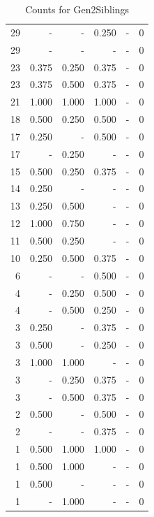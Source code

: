 \documentclass[a4paper]{article}\usepackage{graphicx, color}
\begin{document}
\begin{table}[ht]
\begin{tabular}{rrrrrr}
   \rowcolor{sosoColor} 29 & - & - & 0.250 & - & 0 \\ 
   \rowcolor{nullColor} 29 & - & - & - & - & 0 \\ 
  23 & 0.375 & 0.250 & 0.375 & - & 0 \\ 
  23 & 0.375 & 0.500 & 0.375 & - & 0 \\ 
   \rowcolor{goodColor} 21 & 1.000 & 1.000 & 1.000 & - & 0 \\ 
   \rowcolor{badColor} 18 & 0.500 & 0.250 & 0.500 & - & 0 \\ 
   \rowcolor{sosoColor} 17 & 0.250 & - & 0.500 & - & 0 \\ 
  17 & - & 0.250 & - & - & 0 \\ 
  15 & 0.500 & 0.250 & 0.375 & - & 0 \\ 
   \rowcolor{nullColor} 14 & 0.250 & - & - & - & 0 \\ 
  13 & 0.250 & 0.500 & - & - & 0 \\ 
  12 & 1.000 & 0.750 & - & - & 0 \\ 
  11 & 0.500 & 0.250 & - & - & 0 \\ 
  10 & 0.250 & 0.500 & 0.375 & - & 0 \\ 
   \rowcolor{sosoColor} 6 & - & - & 0.500 & - & 0 \\ 
   \rowcolor{badColor} 4 & - & 0.250 & 0.500 & - & 0 \\ 
   \rowcolor{badColor} 4 & - & 0.500 & 0.250 & - & 0 \\ 
   \rowcolor{sosoColor} 3 & 0.250 & - & 0.375 & - & 0 \\ 
   \rowcolor{sosoColor} 3 & 0.500 & - & 0.250 & - & 0 \\ 
  3 & 1.000 & 1.000 & - & - & 0 \\ 
  3 & - & 0.250 & 0.375 & - & 0 \\ 
  3 & - & 0.500 & 0.375 & - & 0 \\ 
   \rowcolor{sosoColor} 2 & 0.500 & - & 0.500 & - & 0 \\ 
   \rowcolor{sosoColor} 2 & - & - & 0.375 & - & 0 \\ 
   \rowcolor{goodColor} 1 & 0.500 & 1.000 & 1.000 & - & 0 \\ 
  1 & 0.500 & 1.000 & - & - & 0 \\ 
   \rowcolor{nullColor} 1 & 0.500 & - & - & - & 0 \\ 
  1 & - & 1.000 & - & - & 0 \\ 
   \hline
\end{tabular}
\caption{Counts for Gen2Siblings} 
\end{table}
\end{document}
